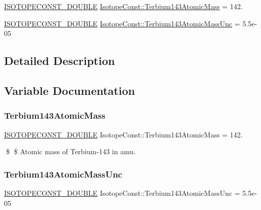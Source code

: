 \begin{DoxyCompactItemize}
\item 
\mbox{\hyperlink{group___isotope_const-_macros_ga8f45a7272ce02c0b4c65c44636ed719a}{I\+S\+O\+T\+O\+P\+E\+C\+O\+N\+S\+T\+\_\+\+D\+O\+U\+B\+LE}} \mbox{\hyperlink{group___isotope_const-_terbium-_tb143_ga045fc4f5368a563306ecd51bc9c91dde}{Isotope\+Const\+::\+Terbium143\+Atomic\+Mass}} = 142.
\item 
\mbox{\hyperlink{group___isotope_const-_macros_ga8f45a7272ce02c0b4c65c44636ed719a}{I\+S\+O\+T\+O\+P\+E\+C\+O\+N\+S\+T\+\_\+\+D\+O\+U\+B\+LE}} \mbox{\hyperlink{group___isotope_const-_terbium-_tb143_gaa68ab4395b974c571394a8d1a7f6927b}{Isotope\+Const\+::\+Terbium143\+Atomic\+Mass\+Unc}} = 5.\+5e-\/05
\end{DoxyCompactItemize}


\subsection{Detailed Description}


\subsection{Variable Documentation}
\mbox{\label{group___isotope_const-_terbium-_tb143_ga045fc4f5368a563306ecd51bc9c91dde}} 
\subsubsection{\texorpdfstring{Terbium143\+Atomic\+Mass}{Terbium143AtomicMass}}
{\footnotesize\ttfamily \mbox{\hyperlink{group___isotope_const-_macros_ga8f45a7272ce02c0b4c65c44636ed719a}{I\+S\+O\+T\+O\+P\+E\+C\+O\+N\+S\+T\+\_\+\+D\+O\+U\+B\+LE}} Isotope\+Const\+::\+Terbium143\+Atomic\+Mass = 142.}

\$ \$ Atomic mass of Terbium-\/143 in amu. \mbox{\label{group___isotope_const-_terbium-_tb143_gaa68ab4395b974c571394a8d1a7f6927b}} 
\subsubsection{\texorpdfstring{Terbium143\+Atomic\+Mass\+Unc}{Terbium143AtomicMassUnc}}
{\footnotesize\ttfamily \mbox{\hyperlink{group___isotope_const-_macros_ga8f45a7272ce02c0b4c65c44636ed719a}{I\+S\+O\+T\+O\+P\+E\+C\+O\+N\+S\+T\+\_\+\+D\+O\+U\+B\+LE}} Isotope\+Const\+::\+Terbium143\+Atomic\+Mass\+Unc = 5.\+5e-\/05}

